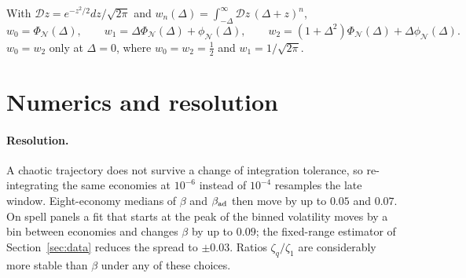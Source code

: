\documentclass[11pt]{article}
\newcommand{\Dz}{\mathcal{D}z}
\newcommand{\PhiN}{\Phi_{\mathcal N}}
\newcommand{\phiN}{\phi_{\mathcal N}}
\newcommand{\bad}{\beta_{\rm ad}}
\begin{document}
With $\Dz=e^{-z^2/2}dz/\sqrt{2\pi}$ and $w_n(\Delta)=\int_{-\Delta}^\infty\Dz\,(\Delta+z)^n$,
\begin{equation}
  w_0=\PhiN(\Delta),\qquad w_1=\Delta\PhiN(\Delta)+\phiN(\Delta),\qquad
  w_2=(1+\Delta^2)\PhiN(\Delta)+\Delta\phiN(\Delta).
\end{equation}
$w_0=w_2$ only at $\Delta=0$, where $w_0=w_2=\tfrac12$ and $w_1=1/\sqrt{2\pi}$.

\section{Numerics and resolution}
\label{app:numerics}

\paragraph{Resolution.}  A chaotic trajectory does not survive a change of integration tolerance,
so re-integrating the same economies at $10^{-6}$ instead of $10^{-4}$ resamples the late window.
Eight-economy medians of $\beta$ and $\bad$ then move by up to $0.05$ and $0.07$.  On spell panels
a fit that starts at the peak of the binned volatility moves by a bin between economies and
changes $\beta$ by up to $0.09$; the fixed-range estimator of Section~\ref{sec:data} reduces the
spread to $\pm0.03$.  Ratios $\zeta_q/\zeta_1$ are considerably more stable than $\beta$ under any of
these choices.
\end{document}
